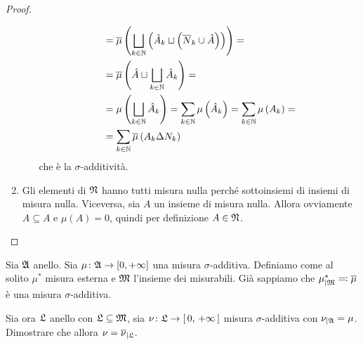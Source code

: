 \documentclass[../EserciziIstituzioniAnalisi.tex]{subfiles}
\begin{document}
\begin{proof}
\begin{enumerate}
\begin{itemize}
\begin{equation*}
\begin{aligned}
          &=\overline \mu\left(\bigsqcup_{k\in \mathbb N} \left(\hat A_k \sqcup \left(\overline N_k \cup\hat A \right)\right)\right)=\\
          &=\overline \mu\left(\hat A \sqcup \bigsqcup_{k\in \mathbb N} \hat A_k \right)=\\
          &=\mu\left(\bigsqcup_{k\in \mathbb N} \hat A_k\right)=\sum_{k \in \mathbb N}\mu\left(\hat A_k\right)=\sum_{k \in \mathbb N}\mu\left(A_k\right)=\\
          &=\sum_{k \in \mathbb N}\overline\mu\left(A_k \Delta N_k\right)
        \end{aligned}
      \end{equation*}
      che è la $\sigma$-additività.
    \end{itemize}
    \item Gli elementi di $\mathfrak N$ hanno tutti misura nulla perché sottoinsiemi di insiemi di misura nulla. Viceversa, sia $A$ un insieme di misura nulla. Allora ovviamente $A\subseteq A$ e $\mu(A)=0$, quindi per definizione $A\in \mathfrak N$.
  \end{enumerate}
\end{proof}

\begin{exercise}[2016-10-24]
  Sia $\mathfrak A$ anello.
  Sia $\mu \colon \mathfrak A \to [0,+\infty]$ una misura $\sigma$-additiva.
  Definiamo come al solito $\mu^{*}$ misura esterna e $\mathfrak M$ l'insieme dei misurabili.
  Già sappiamo che $\mu^{*}_{\mid\mathfrak M} \eqqcolon \overline{\mu}$ è una misura $\sigma$-additiva.

  Sia ora $\mathfrak L$ anello con $\mathfrak L \subseteq \mathfrak M$, sia $\nu \colon \mathfrak L \to \left[\,0,\,+\infty\,\right]$ misura $\sigma$-additiva con $\nu_{\mid\mathfrak A} = \mu$.
  Dimostrare che allora $\nu = \overline{\nu}_{\mid\mathfrak L}$.
\end{exercise}
\end{document}
